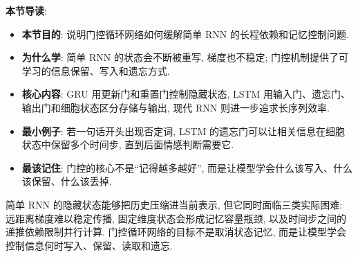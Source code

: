 \documentclass{../nndlcourse}
\begin{document}
\textbf{本节导读}:
\begin{itemize}
  \item \textbf{本节目的}: 说明门控循环网络如何缓解简单 RNN 的长程依赖和记忆控制问题.
  \item \textbf{为什么学}: 简单 RNN 的状态会不断被重写, 梯度也不稳定; 门控机制提供了可学习的信息保留、写入和遗忘方式.
  \item \textbf{核心内容}: GRU 用更新门和重置门控制隐藏状态, LSTM 用输入门、遗忘门、输出门和细胞状态区分存储与输出, 现代 RNN 则进一步追求长序列效率.
  \item \textbf{最小例子}: 若一句话开头出现否定词, LSTM 的遗忘门可以让相关信息在细胞状态中保留多个时间步, 直到后面情感判断需要它.
  \item \textbf{最该记住}: 门控的核心不是“记得越多越好”, 而是让模型学会什么该写入、什么该保留、什么该丢掉.
\end{itemize}

简单 RNN 的隐藏状态能够把历史压缩进当前表示, 但它同时面临三类实际困难: 远距离梯度难以稳定传播, 固定维度状态会形成记忆容量瓶颈, 以及时间步之间的递推依赖限制并行计算. 门控循环网络的目标不是取消状态记忆, 而是让模型学会控制信息何时写入、保留、读取和遗忘.
\end{document}
